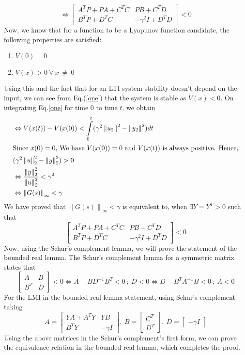 \documentclass[a4paper,12pt]{article}
\newcommand\norm[1]{\left\lVert#1\right\rVert}
\begin{document}
		\[
		\Leftrightarrow
		\begin{bmatrix}
		A^{T}P+PA+C^{T}C & PB+C^{T}D \\
		B^{T}P+D^{T}{C} & -\gamma^{2} I + D^{T}D
		\end{bmatrix}
		< 0
		\]
		Now, we know that for a function to be a Lyapunov function candidate, the following properties are satisfied:
		\begin{enumerate}
		\label{ly}
		\item $V(0)=0$ 
		\item $V(x)>0\: \forall\: x\:\neq\:0$
		\end{enumerate}Using this and the fact that for an LTI system stability doesn't depend on the input, we can see from Eq.(\ref{one}) that the system is stable as $\dot{V}(x) < 0$. On integrating Eq.\ref{one} for time $0$ to time $t$, we obtain
		\begin{align}
		&\Leftrightarrow V(x(t))-V(x(0)) < \int\limits_{0}^{t} (\gamma^{2}\norm{{u}_{2}}^{2} - \norm{{y}_{2}}^{2}) dt\\
		\intertext{Since $x(0)=0$, We have $V(x(0))=0$ and $V(x(t))$ is always positive. Hence,}
		&(\gamma^{2}\norm{u}_{2}^{2} - \norm{y}_{2}^{2}) > 0\\
		&\Leftrightarrow\frac{\norm{y}_{2}^{2}}{\norm{u}_{2}^{2}} < \gamma^{2}\\
		&\Leftrightarrow\norm{G(s)}_{\infty} < \gamma
		\end{align}
		We have proved that $\norm{G(s)}_{\infty} < \gamma$ is equivalent to, when $\exists Y=Y^{T} > 0$ such that 
		\[		
		\begin{bmatrix}
		A^{T}P+PA+C^{T}C & PB+C^{T}D \\
		B^{T}P+D^{T}{C} & -\gamma^{2} I + D^{T}D
		\end{bmatrix}
		< 0
		\]
		Now, using the Schur's complement lemma, we will prove the statement of the bounded real lemma. The Schur's complement lemma for a symmetric matrix states that
		\[
		\begin{bmatrix}
		A & B \\ B^{T} & D
		\end{bmatrix}
		< 0
		\Leftrightarrow
		A-BD^{-1}B^{T} < 0\: ; \:D < 0
		\Leftrightarrow
		D-B^{T}A^{-1}B < 0 \: ; \: A < 0
		\]
		For the LMI in the bounded real lemma statement, using Schur's complement taking 
		\[
		A=
		\begin{bmatrix}
		YA+A^{T}Y & YB \\
		B^{T}Y & -\gamma I 
		\end{bmatrix}
		,\:B=
		\begin{bmatrix}
		 C^{T} \\
		D^{T}
		\end{bmatrix}
		,\:D=
		\begin{bmatrix}
		-\gamma I
		\end{bmatrix}
		\]
		Using the above matrices in the Schur's complement's first form, we can prove the equivalence relation in the bounded real lemma, which completes the proof. 
\end{document}
